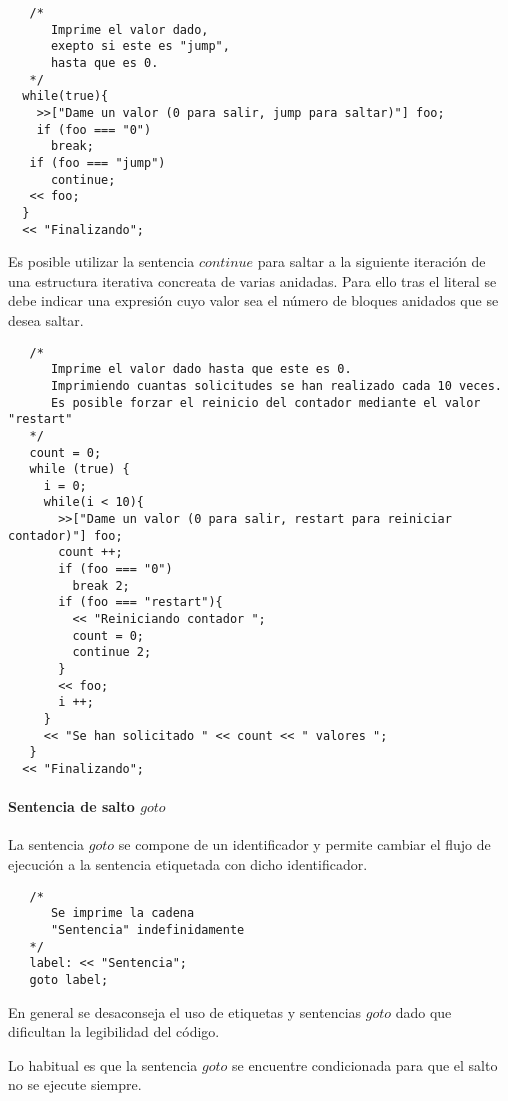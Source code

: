 \begin{lstlisting}
   /*
      Imprime el valor dado,
      exepto si este es "jump",
      hasta que es 0.
   */
  while(true){
    >>["Dame un valor (0 para salir, jump para saltar)"] foo;
    if (foo === "0")
      break;
   if (foo === "jump")
      continue;
   << foo;
  }
  << "Finalizando";
\end{lstlisting}

Es posible utilizar la sentencia $continue$ para saltar a la siguiente iteración de una estructura iterativa concreata de varias anidadas. Para ello tras el literal 
se debe indicar una expresión cuyo valor sea el número de bloques anidados que se desea saltar. \\

\begin{lstlisting}
   /*
      Imprime el valor dado hasta que este es 0.
      Imprimiendo cuantas solicitudes se han realizado cada 10 veces.
      Es posible forzar el reinicio del contador mediante el valor "restart"
   */
   count = 0;
   while (true) {
     i = 0;
     while(i < 10){
       >>["Dame un valor (0 para salir, restart para reiniciar contador)"] foo;
       count ++;
       if (foo === "0")
         break 2;
       if (foo === "restart"){
         << "Reiniciando contador ";
         count = 0;
         continue 2;
       }
       << foo;
       i ++;
     }
     << "Se han solicitado " << count << " valores ";
   }
  << "Finalizando";
\end{lstlisting} 

\paragraph{Sentencia de salto $goto$} \label{sec:stmt_goto}
La sentencia $goto$ se compone de un identificador y  permite cambiar el flujo de ejecución a la sentencia etiquetada con dicho identificador. \\

\begin{lstlisting}
   /*
      Se imprime la cadena
      "Sentencia" indefinidamente
   */
   label: << "Sentencia";
   goto label;
\end{lstlisting}

En general se desaconseja el uso de etiquetas y sentencias $goto$ dado que dificultan la legibilidad del código.

Lo habitual es que la sentencia $goto$ se encuentre condicionada para que el salto no se ejecute siempre. \\

